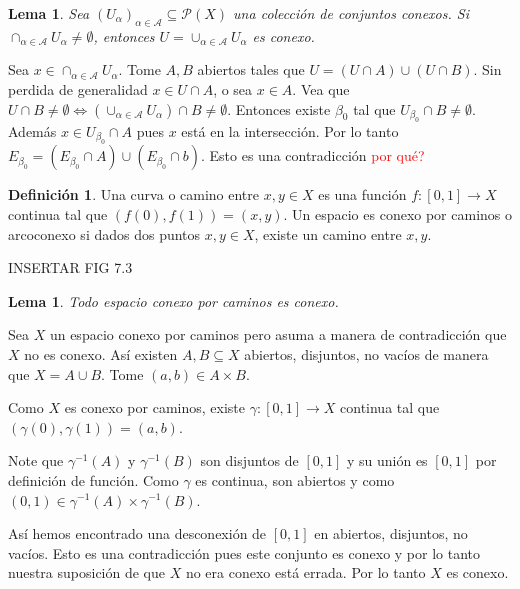 \documentclass[12pt]{article}
\theoremstyle{plain}
\newtheorem{Lem}[Th]{Lema}             %
\theoremstyle{definition}
\newtheorem{Def}[Th]{Definición}       %
\theoremstyle{remark}
\numberwithin{equation}{section}
\newcommand{\cA}{\mathcal{A}}       %
\newcommand{\cP}{\mathcal{P}}       %
\renewcommand{\:}{\colon}           %
\newcommand{\bonj}[1]{\left\lbrack#1\right\rbrack}
\begin{document}
\begin{multicols}{2}
\begin{Lem}
  Sea $(U_\alpha)_{\alpha\in\cA}\subseteq\cP(X)$ una colección de conjuntos conexos. Si $\cap_{\alpha\in\cA}U_\alpha\neq\emptyset$, entonces $U=\cup_{\alpha\in\cA}U_\alpha$ es conexo.
\end{Lem}

\begin{ptcbp}
Sea $x\in \cap_{\alpha\in\cA}U_\alpha$. Tome $A,B$ abiertos tales que $U=(U\cap A)\cup(U\cap B)$. Sin perdida de generalidad $x\in U\cap A$, o sea $x\in A$. Vea que $U\cap B\neq \emptyset\iff (\cup_{\alpha\in\cA}U_\alpha)\cap B\neq\emptyset$. Entonces existe $\beta_0$ tal que $U_{\beta_0}\cap B\neq \emptyset$. Además $x\in U_{\beta_0}\cap A$ pues $x$ está en la intersección. Por lo tanto $E_{\beta_0}=(E_{\beta_0}\cap A)\cup (E_{\beta_0}\cap b)$. Esto es una contradicción \textcolor{red}{por qué?}
\end{ptcbp}

\begin{Def}
Una curva o camino entre $x,y\in X$ es una función
$f\colon\bonj{0,1}\to X$ continua tal que $(f(0),f(1))=(x,y)$. Un espacio es conexo por caminos o arcoconexo si dados dos puntos $x,y\in X$, existe un camino entre $x,y$.
\end{Def}
INSERTAR FIG 7.3\par
\begin{Lem}
  Todo espacio conexo por caminos es conexo.
\end{Lem}

\begin{ptcbp}
Sea $X$ un espacio conexo por caminos pero asuma a manera de contradicción que $X$ no es conexo. Así existen $A,B\subseteq X$ abiertos, disjuntos, no vacíos de manera que $X=A\cup B$. Tome $(a,b)\in A\times B$.\par
Como $X$ es conexo por caminos, existe $\gamma\colon\bonj{0,1}\to X$ continua tal que $(\gamma(0),\gamma(1))=(a,b)$. \par
Note que $\gamma^{-1}(A)$ y $\gamma^{-1}(B)$ son disjuntos de $\bonj{0,1}$ y su unión es $\bonj{0,1}$ por definición de función. Como $\gamma$ es continua, son abiertos y como $(0,1)\in \gamma^{-1}(A)\times\gamma^{-1}(B)$. \par
Así hemos encontrado una desconexión de $\bonj{0,1}$ en abiertos, disjuntos, no vacíos. Esto es una contradicción pues este conjunto es conexo y por lo tanto nuestra suposición de que $X$ no era conexo está errada. Por lo tanto $X$ es conexo.
\end{ptcbp}


\end{multicols}
\end{document}
